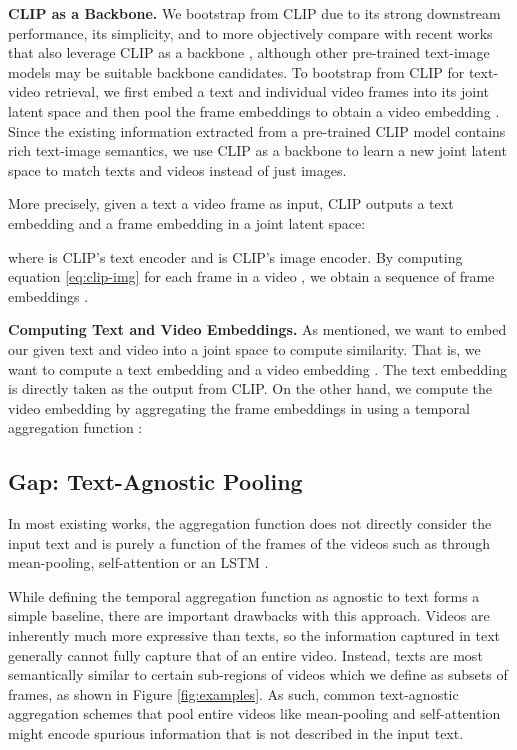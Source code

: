 \documentclass[10pt,twocolumn,letterpaper]{article}
\begin{document}
\textbf{CLIP as a Backbone.} We bootstrap from CLIP \cite{radford2021learning} due to its strong downstream performance, its simplicity, and to more objectively compare with recent works that also leverage CLIP as a backbone \cite{portillo2021straightforward, luo2021clip4clip}, although other pre-trained text-image models may be suitable backbone candidates. 
To bootstrap from CLIP for text-video retrieval, we first embed a text and individual video frames into its joint latent space and then pool the frame embeddings to obtain a video embedding \cite{portillo2021straightforward}. Since the existing information extracted from a pre-trained CLIP model contains rich text-image semantics, we use CLIP as a backbone to learn a new joint latent space to match texts and videos instead of just images.

More precisely, given a text  a video frame  as input, CLIP outputs a text embedding  and a frame embedding  in a joint latent space: 

where  is CLIP's text encoder and  is CLIP's image encoder. By computing equation \eqref{eq:clip-img} for each frame in a video , we obtain a sequence of frame embeddings .

\textbf{Computing Text and Video Embeddings.} As mentioned, we want to embed our given text and video into a joint space to compute similarity. That is, we want to compute a text embedding  and a video embedding . The text embedding is directly taken as the output from CLIP. On the other hand, we compute the video embedding by aggregating the frame embeddings in  using a temporal aggregation function :


\subsection{Gap: Text-Agnostic Pooling}
\label{sec:no-text-pool}
In most existing works, the aggregation function  does not directly consider the input text and is purely a function of the frames of the videos such as through mean-pooling, self-attention or an LSTM \cite{miech2019howto100m, gabeur2020multi, miech2020end, alayrac2020self, bain2021frozen, portillo2021straightforward, luo2021clip4clip}.

While defining the temporal aggregation function as agnostic to text forms a simple baseline, there are important drawbacks with this approach. Videos are inherently much more expressive than texts, so the information captured in text generally cannot fully capture that of an entire video. Instead, texts are most semantically similar to certain sub-regions of videos which we define as subsets of frames, as shown in Figure \ref{fig:examples}. As such, common text-agnostic aggregation schemes that pool entire videos like mean-pooling and self-attention might encode spurious information that is not described in the input text.
\end{document}
